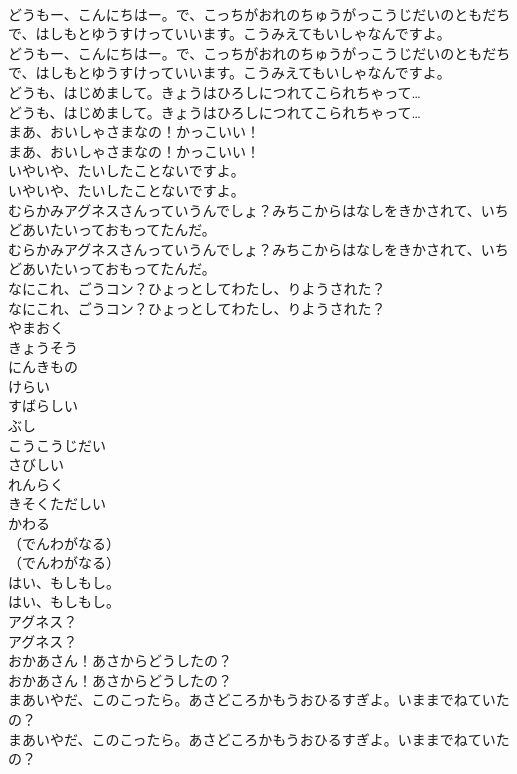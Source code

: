 \documentclass[8pt]{extreport}
\begin{document}
\begin{CJK}{UTF8}{min}
\\	どうもー、こんにちはー。で、こっちがおれのちゅうがっこうじだいのともだちで、はしもとゆうすけっていいます。こうみえてもいしゃなんですよ。	
\\	どうもー、こんにちはー。で、こっちがおれのちゅうがっこうじだいのともだちで、はしもとゆうすけっていいます。こうみえてもいしゃなんですよ。 
\\	どうも、はじめまして。きょうはひろしにつれてこられちゃって…	
\\	どうも、はじめまして。きょうはひろしにつれてこられちゃって… 
\\	まあ、おいしゃさまなの！かっこいい！	
\\	まあ、おいしゃさまなの！かっこいい！ 
\\	いやいや、たいしたことないですよ。	
\\	いやいや、たいしたことないですよ。 
\\	むらかみアグネスさんっていうんでしょ？みちこからはなしをきかされて、いちどあいたいっておもってたんだ。	
\\	むらかみアグネスさんっていうんでしょ？みちこからはなしをきかされて、いちどあいたいっておもってたんだ。 
\\	なにこれ、ごうコン？ひょっとしてわたし、りようされた？	
\\	なにこれ、ごうコン？ひょっとしてわたし、りようされた？ 
\\	やまおく
\\	きょうそう
\\	にんきもの
\\	けらい
\\	すばらしい
\\	ぶし
\\	こうこうじだい
\\	さびしい
\\	れんらく
\\	きそくただしい
\\	かわる
\\	（でんわがなる）	
\\	（でんわがなる） 
\\	はい、もしもし。	
\\	はい、もしもし。 
\\	アグネス？	
\\	アグネス？ 
\\	おかあさん！あさからどうしたの？	
\\	おかあさん！あさからどうしたの？ 
\\	まあいやだ、このこったら。あさどころかもうおひるすぎよ。いままでねていたの？	
\\	まあいやだ、このこったら。あさどころかもうおひるすぎよ。いままでねていたの？ 

\end{CJK}
\end{document}
